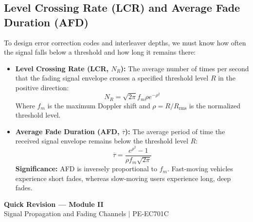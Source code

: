 \documentclass[12pt,a4paper]{article}
\begin{document}
\subsection{Level Crossing Rate (LCR) and Average Fade Duration (AFD)}
To design error correction codes and interleaver depths, we must know how often the signal falls below a threshold and how long it remains there:
\begin{itemize}[leftmargin=*, itemsep=3.5pt]
  \item \textbf{Level Crossing Rate (LCR, $N_R$):} The average number of times per second that the fading signal envelope crosses a specified threshold level $R$ in the positive direction:
    \begin{equation}
      N_R = \sqrt{2\pi} f_m \rho e^{-\rho^2}
    \end{equation}
    Where $f_m$ is the maximum Doppler shift and $\rho = R/R_{\text{rms}}$ is the normalized threshold level.
  \item \textbf{Average Fade Duration (AFD, $\overline{\tau}$):} The average period of time the received signal envelope remains below the threshold level $R$:
    \begin{equation}
      \overline{\tau} = \frac{e^{\rho^2} - 1}{\rho f_m \sqrt{2\pi}}
    \end{equation}
    \textbf{Significance:} AFD is inversely proportional to $f_m$. Fast-moving vehicles experience short fades, whereas slow-moving users experience long, deep fades.
\end{itemize}

\newpage
\begin{center}
  {\large\bfseries\color{myred} Quick Revision --- Module II}\\[3pt]
  {\small\color{mydark} Signal Propagation and Fading Channels $|$ PE-EC701C}
\end{center}
\noindent{\color{myred}\rule{\linewidth}{1.2pt}}
\vspace{4pt}
\end{document}
